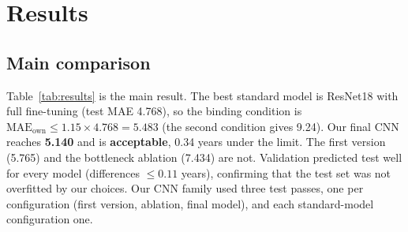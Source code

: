 \documentclass[conference,a4paper]{IEEEtran}
\begin{document}
\section{Results}
\label{sec:results}
\subsection{Main comparison}
Table~\ref{tab:results} is the main result. The best standard model is ResNet18 with full fine-tuning (test MAE 4.768), so the binding condition is $\mathrm{MAE}_{\text{own}} \le 1.15\times4.768 = 5.483$ (the second condition gives 9.24). Our final CNN reaches \textbf{5.140} and is \textbf{acceptable}, 0.34 years under the limit. The first version (5.765) and the bottleneck ablation (7.434) are not. Validation predicted test well for every model (differences $\le0.11$ years), confirming that the test set was not overfitted by our choices. Our CNN family used three test passes, one per configuration (first version, ablation, final model), and each standard-model configuration one.
\end{document}

